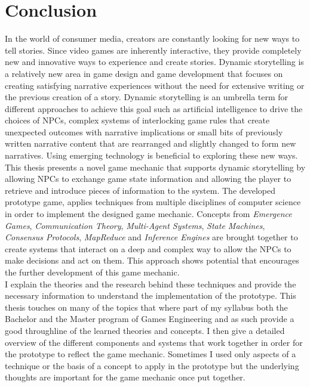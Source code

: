 \chapter{Conclusion}
In the world of consumer media, creators are constantly looking for new ways to tell stories. Since video games are inherently interactive, they provide completely new and innovative ways to experience and create stories. Dynamic storytelling is a relatively new area in game design and game development that focuses on creating satisfying narrative experiences without the need for extensive writing or the previous creation of a story. Dynamic storytelling is an umbrella term for different approaches to achieve this goal such as artificial intelligence to drive the choices of NPCs, complex systems of interlocking game rules that create unexpected outcomes with narrative implications or small bits of previously written narrative content that are rearranged and slightly changed to form new narratives. Using emerging technology is beneficial to exploring these new ways.\\
This thesis presents a novel game mechanic that supports dynamic storytelling by allowing NPCs to exchange game state information and allowing the player to retrieve and introduce pieces of information to the system. The developed prototype game, applies techniques from multiple disciplines of computer science in order to implement the designed game mechanic. Concepts from \textit{Emergence Games}, \textit{Communication Theory}, \textit{Multi-Agent Systems}, \textit{State Machines}, \textit{Consensus Protocols}, \textit{MapReduce} and \textit{Inference Engines} are brought together to create systems that interact on a deep and complex way to allow the NPCs to make decisions and act on them. This approach shows potential that encourages the further development of this game mechanic.\\
I explain the theories and the research behind these techniques and provide the necessary information to understand the implementation of the prototype. This thesis touches on many of the topics that where part of my syllabus both the Bachelor and the Master program of Games Engineering and as such provide a good throughline of the learned theories and concepts. I then give a detailed overview of the different components and systems that work together in order for the prototype to reflect the game mechanic. Sometimes I used only aspects of a technique or the basis of a concept to apply in the prototype but the underlying thoughts are important for the game mechanic once put together.\\
